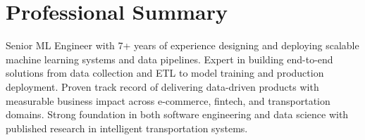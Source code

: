 \documentclass[12pt, a4paper, sans]{moderncv}
\begin{document}
\maketitle

\section{Professional Summary}
Senior ML Engineer with 7+ years of experience designing and deploying scalable machine learning systems and data pipelines. Expert in building end-to-end solutions from data collection and ETL to model training and production deployment. Proven track record of delivering data-driven products with measurable business impact across e-commerce, fintech, and transportation domains. Strong foundation in both software engineering and data science with published research in intelligent transportation systems.





\end{document}
